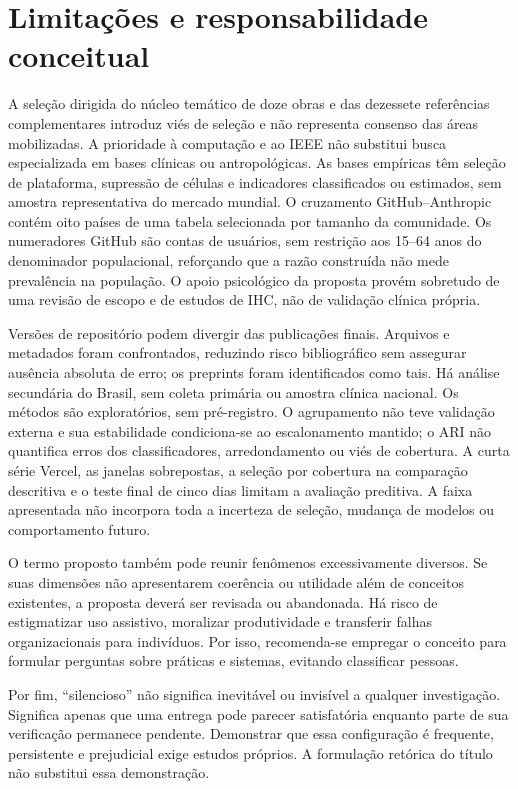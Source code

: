 \documentclass[11pt,a4paper]{article}
\begin{document}
\section{Limitações e responsabilidade conceitual}
A seleção dirigida do núcleo temático de doze obras e das dezessete referências complementares introduz viés de seleção e não representa consenso das áreas mobilizadas. A prioridade à computação e ao IEEE não substitui busca especializada em bases clínicas ou antropológicas. As bases empíricas têm seleção de plataforma, supressão de células e indicadores classificados ou estimados, sem amostra representativa do mercado mundial. O cruzamento GitHub--Anthropic contém oito países de uma tabela selecionada por tamanho da comunidade. Os numeradores GitHub são contas de usuários, sem restrição aos 15--64 anos do denominador populacional, reforçando que a razão construída não mede prevalência na população. O apoio psicológico da proposta provém sobretudo de uma revisão de escopo e de estudos de IHC, não de validação clínica própria.

Versões de repositório podem divergir das publicações finais. Arquivos e metadados foram confrontados, reduzindo risco bibliográfico sem assegurar ausência absoluta de erro; os preprints foram identificados como tais. Há análise secundária do Brasil, sem coleta primária ou amostra clínica nacional. Os métodos são exploratórios, sem pré-registro. O agrupamento não teve validação externa e sua estabilidade condiciona-se ao escalonamento mantido; o ARI não quantifica erros dos classificadores, arredondamento ou viés de cobertura. A curta série Vercel, as janelas sobrepostas, a seleção por cobertura na comparação descritiva e o teste final de cinco dias limitam a avaliação preditiva. A faixa apresentada não incorpora toda a incerteza de seleção, mudança de modelos ou comportamento futuro.

O termo proposto também pode reunir fenômenos excessivamente diversos. Se suas dimensões não apresentarem coerência ou utilidade além de conceitos existentes, a proposta deverá ser revisada ou abandonada. Há risco de estigmatizar uso assistivo, moralizar produtividade e transferir falhas organizacionais para indivíduos. Por isso, recomenda-se empregar o conceito para formular perguntas sobre práticas e sistemas, evitando classificar pessoas.

Por fim, ``silencioso'' não significa inevitável ou invisível a qualquer investigação. Significa apenas que uma entrega pode parecer satisfatória enquanto parte de sua verificação permanece pendente. Demonstrar que essa configuração é frequente, persistente e prejudicial exige estudos próprios. A formulação retórica do título não substitui essa demonstração.
\end{document}
